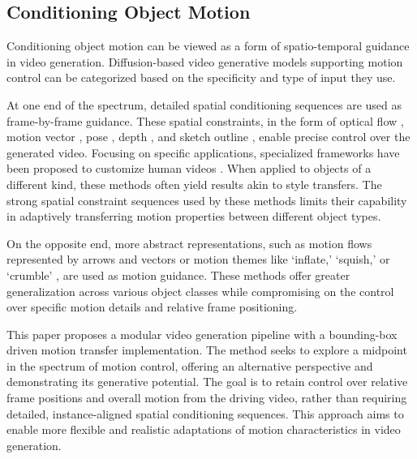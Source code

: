 \subsection{Conditioning Object Motion}

Conditioning object motion can be viewed as a form of spatio-temporal guidance in video generation. Diffusion-based video generative models supporting motion control can be categorized based on the specificity and type of input they use.

At one end of the spectrum, detailed spatial conditioning sequences are used as frame-by-frame guidance. These spatial constraints, in the form of optical flow \cite{ni2023conditional}, motion vector \cite{2023videocomposer}, pose \cite{feng2023dreamoving}, depth \cite{2023videocomposer, feng2023dreamoving}, and sketch outline \cite{2023videocomposer}, enable precise control over the generated video. Focusing on specific applications, specialized frameworks have been proposed to customize human videos \cite{feng2023dreamoving}. When applied to objects of a different kind, these methods often yield results akin to style transfers. The strong spatial constraint sequences used by these methods limits their capability in adaptively transferring motion properties between different object types.

On the opposite end, more abstract representations, such as motion flows represented by arrows \cite{yin2023dragnuwa, 2023videocomposer} and vectors \cite{2023videocomposer} or motion themes like ‘inflate,’ ‘squish,’ or ‘crumble’ \cite{Pikaffect}, are used as motion guidance. These methods offer greater generalization across various object classes while compromising on the control over specific motion details and relative frame positioning.

This paper proposes a modular video generation pipeline with a bounding-box driven motion transfer implementation. The method seeks to explore a midpoint in the spectrum of motion control, offering an alternative perspective and demonstrating its generative potential. The goal is to retain control over relative frame positions and overall motion from the driving video, rather than requiring detailed, instance-aligned spatial conditioning sequences. This approach aims to enable more flexible and realistic adaptations of motion characteristics in video generation.
